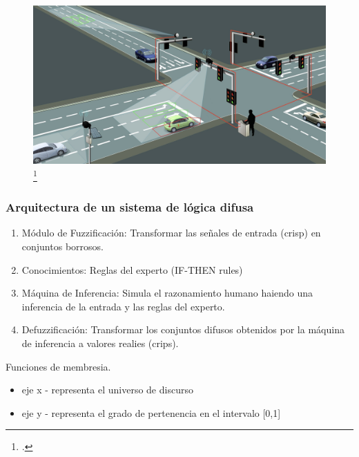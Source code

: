 \documentclass[
	11pt, %
]{beamer}
\begin{document}
\begin{frame}
  \begin{figure}
    \includegraphics[width=0.8\linewidth]{control_systems.jpg}\footcite{autoevolucion}\\
  \end{figure}
\end{frame}

\begin{frame}
  \frametitle{Arquitectura de un sistema de lógica difusa}

  \begin{enumerate}
  \item Módulo de Fuzzificación: Transformar las señales de entrada (crisp) en conjuntos borrosos.
  \item Conocimientos: Reglas del experto (IF-THEN rules)
  \item Máquina de Inferencia: Simula el razonamiento humano haiendo una inferencia de la entrada y las reglas del experto.
  \item Defuzzificación: Transformar los conjuntos difusos obtenidos por la máquina de inferencia a valores realies (crips).
  \end{enumerate}

  Funciones de membresia.
  \begin{itemize}
  \item eje x - representa el universo de discurso
  \item eje y - representa el grado de pertenencia en el intervalo [0,1]
  \end{itemize}
  
\end{frame}
\end{document}
